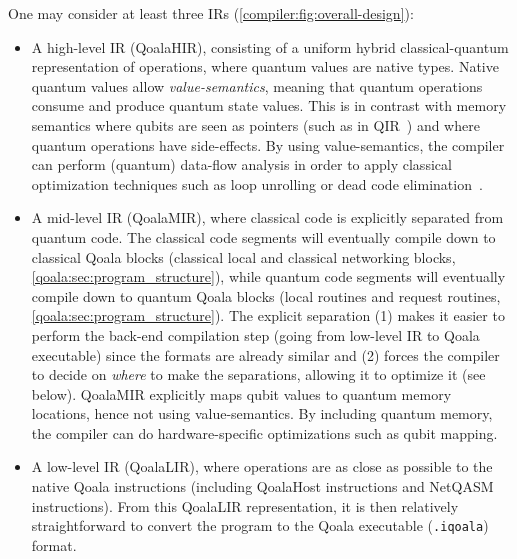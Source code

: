 One may consider at least three \ac{IR}s (\cref{compiler:fig:overall-design}):
\begin{itemize}
  \item A high-level \ac{IR} (QoalaHIR), consisting of a uniform hybrid classical-quantum representation of operations, where quantum values are native types.
  Native quantum values allow \emph{value-semantics}, meaning that quantum operations consume and produce quantum state values.
  This is in contrast with memory semantics where qubits are seen as pointers (such as in QIR~\cite{haner_software_2018, geller_introducing_2020}) and where quantum operations have side-effects.
  By using value-semantics, the compiler can perform (quantum) data-flow analysis in order to apply classical optimization techniques such as loop unrolling or dead code elimination~\cite{peduri_qssa_2022, ittah_enabling_2022}.
  \item A mid-level \ac{IR} (QoalaMIR), where classical code is explicitly separated from quantum code.
  The classical code segments will eventually compile down to classical Qoala blocks (classical local and classical networking blocks, \cref{qoala:sec:program_structure}), while quantum code segments will eventually compile down to quantum Qoala blocks (local routines and request routines, \cref{qoala:sec:program_structure}).
  The explicit separation (1) makes it easier to perform the back-end compilation step (going from low-level IR to Qoala executable) since the formats are already similar and (2) forces the compiler to decide on \emph{where} to make the separations, allowing it to optimize it (see below).
  QoalaMIR explicitly maps qubit values to quantum memory locations, hence not using value-semantics.
  By including quantum memory, the compiler can do hardware-specific optimizations such as qubit mapping.
  \item A low-level \ac{IR} (QoalaLIR), where operations are as close as possible to the native Qoala instructions (including QoalaHost instructions and NetQASM instructions).
  From this QoalaLIR representation, it is then relatively straightforward to convert the program to the Qoala executable (\texttt{.iqoala}) format.
\end{itemize}


